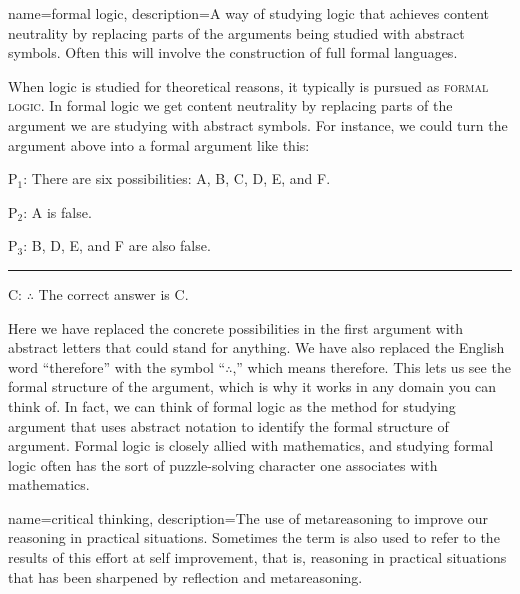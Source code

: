 {
name=formal logic,
description={A way of studying logic that achieves content neutrality by replacing parts of the arguments being studied with abstract symbols. Often this will involve the construction of full formal languages.}
}


When logic is studied for theoretical reasons, it typically is pursued as \textsc{\gls{formal logic}}. \label{def:Formal_logic} In formal logic we get content neutrality by replacing parts of the argument we are studying with abstract symbols. For instance, we could turn the argument above into a formal argument like this:

\label{argClueformal}
\begin{earg}
\item[P$_1$:] There are six possibilities: A, B, C, D, E, and F.
\item[P$_2$:] A is false.
\item[P$_3$:] B, D, E, and F are also false.
\vspace{-.5em}
\item [] \rule{0.6\linewidth}{.5pt} 
\item[C:]  $\therefore$ The correct answer is C.
\end{earg} 

Here we have replaced the concrete possibilities in the first argument with abstract letters that could stand for anything. We have also replaced the English word ``therefore'' with the symbol ``$\therefore$,'' which means therefore. This lets us see the formal structure of the argument, which is why it works in any domain you can think of. In fact, we can think of formal logic as the method for studying argument that uses abstract notation to identify the formal structure of argument.  Formal logic is closely allied with mathematics, and studying formal logic often has the sort of puzzle-solving character one associates with mathematics. 
	{
	{
{}	
	{}	}}
 
{
name=critical thinking,
description={The use of metareasoning to improve our reasoning in practical situations. Sometimes the term is also used to refer to the results of this effort at self improvement, that is, reasoning in practical situations that has been sharpened by reflection and metareasoning.}
}

